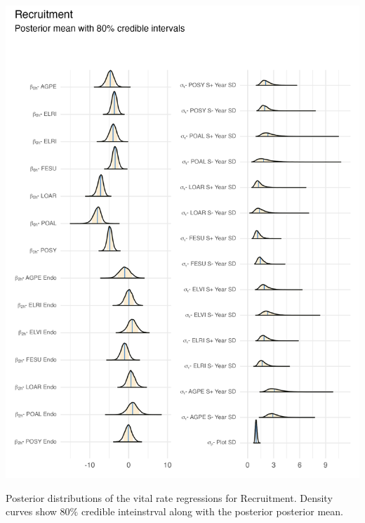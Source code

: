 \documentclass[lineno, sn-basic]{sn-jnl}%
\begin{document}
\begin{myfigure}[H]
	\centering
	\includegraphics[width = \linewidth]{stos_posteriors_plot.png}
	\caption[Posterior distributions of the vital rate regressions for Recruitment]{Posterior distributions of the vital rate regressions for Recruitment. Density curves show $80\%$ credible inteinstrval along with the posterior posterior mean.}
\end{myfigure}
\end{document}
